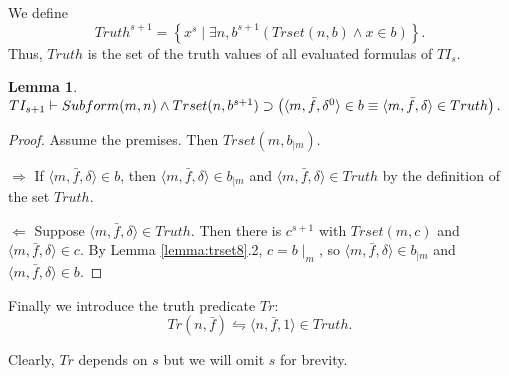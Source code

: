 \documentclass{asl}
\newtheorem{lemma}{Lemma}[section]
\theoremstyle{definition}
\begin{document}
We define
\[Truth^{s+1}=\left\lbrace x^s\mid \exists n,b^{s+1}(Trset(n,b)\wedge x\in b)\right\rbrace. \]
Thus, $Truth$ is the set of the truth values of all evaluated formulas of $TI_s$.

\begin{lemma}
$TI_{s+1}\vdash Subform(m,n)\wedge Trset(n,b^{s+1})
\medskip
\\
\supset\left(\langle m,\bar{f},\delta^0\rangle\in b\equiv \langle m,\bar{f},\delta\rangle\in Truth\right).$
\label{lemma:trset10}
\end{lemma}
\begin{proof}
Assume the premises. Then $Trset(m,b_{\mid m})$.
\medskip

$\Rightarrow$ If $\langle m,\bar{f},\delta\rangle\in b$, then $\langle  m,\bar{f},\delta\rangle\in b_{\mid m}$ and $\langle m,\bar{f},\delta\rangle\in Truth$ by the definition of the set $Truth$.

$\Leftarrow$ Suppose $\langle m,\bar{f},\delta\rangle\in Truth$. Then there is $c^{s+1}$ with 
$Trset(m,c)$ and $\langle m,\bar{f},\delta\rangle\in c$. By Lemma \ref{lemma:trset8}.2, $c=b\mid_m$, so $\langle m,\bar{f},\delta\rangle\in b_{\mid m}$ and $\langle m,\bar{f},\delta\rangle\in b$.
\end{proof}

Finally we introduce the truth predicate $Tr$:
\[Tr(n,\bar{f})\leftrightharpoons \langle n,\bar{f}, 1\rangle \in Truth.\]

Clearly, $Tr$ depends on $s$ but we will omit $s$ for brevity.
\end{document}
